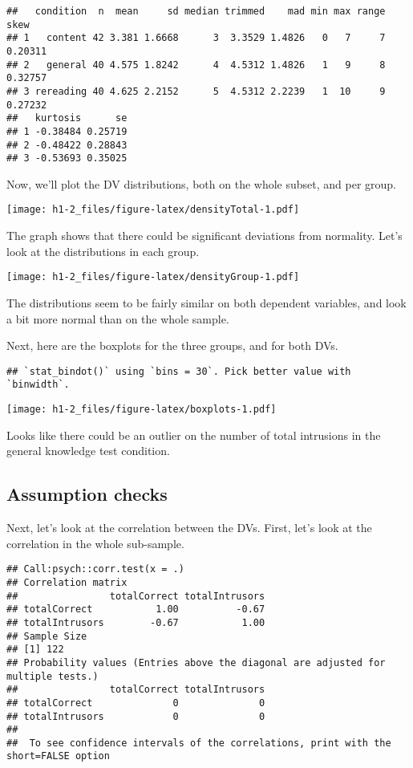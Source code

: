 \documentclass[12pt,]{article}
\begin{document}
\begin{verbatim}
##   condition  n  mean     sd median trimmed    mad min max range    skew
## 1   content 42 3.381 1.6668      3  3.3529 1.4826   0   7     7 0.20311
## 2   general 40 4.575 1.8242      4  4.5312 1.4826   1   9     8 0.32757
## 3 rereading 40 4.625 2.2152      5  4.5312 2.2239   1  10     9 0.27232
##   kurtosis      se
## 1 -0.38484 0.25719
## 2 -0.48422 0.28843
## 3 -0.53693 0.35025
\end{verbatim}

Now, we'll plot the DV distributions, both on the whole subset, and per
group.

\texttt{[image: h1-2\_files/figure-latex/densityTotal-1.pdf]}

The graph shows that there could be significant deviations from
normality. Let's look at the distributions in each group.

\texttt{[image: h1-2\_files/figure-latex/densityGroup-1.pdf]}

The distributions seem to be fairly similar on both dependent variables,
and look a bit more normal than on the whole sample.

Next, here are the boxplots for the three groups, and for both DVs.

\begin{verbatim}
## `stat_bindot()` using `bins = 30`. Pick better value with `binwidth`.
\end{verbatim}

\texttt{[image: h1-2\_files/figure-latex/boxplots-1.pdf]}

Looks like there could be an outlier on the number of total intrusions
in the general knowledge test condition.

\hypertarget{assumption-checks}{%
\subsection{Assumption checks}\label{assumption-checks}}

Next, let's look at the correlation between the DVs. First, let's look
at the correlation in the whole sub-sample.

\begin{verbatim}
## Call:psych::corr.test(x = .)
## Correlation matrix 
##                totalCorrect totalIntrusors
## totalCorrect           1.00          -0.67
## totalIntrusors        -0.67           1.00
## Sample Size 
## [1] 122
## Probability values (Entries above the diagonal are adjusted for multiple tests.) 
##                totalCorrect totalIntrusors
## totalCorrect              0              0
## totalIntrusors            0              0
## 
##  To see confidence intervals of the correlations, print with the short=FALSE option
\end{verbatim}
\end{document}
